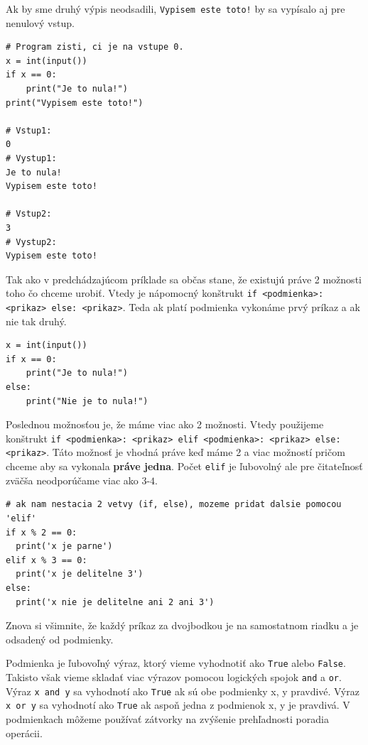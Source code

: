 \documentclass{article}
\begin{document}
Ak by sme druhý výpis neodsadili, \texttt{Vypisem este toto!} by sa vypísalo aj pre nenulový vstup.
\begin{lstlisting}
# Program zisti, ci je na vstupe 0.
x = int(input())
if x == 0:
    print("Je to nula!")
print("Vypisem este toto!")
    
# Vstup1:
0
# Vystup1:
Je to nula!
Vypisem este toto!

# Vstup2:
3
# Vystup2:
Vypisem este toto!
\end{lstlisting}

Tak ako v predchádzajúcom príklade sa občas stane, že existujú práve 2 možnosti toho čo chceme urobiť. Vtedy je nápomocný konštrukt \texttt{if <podmienka>: <prikaz> else: <prikaz>}. Teda ak platí podmienka vykonáme prvý príkaz a ak nie tak druhý.

\begin{lstlisting}
x = int(input())
if x == 0:
    print("Je to nula!")
else:
    print("Nie je to nula!")
\end{lstlisting}

Poslednou možnosťou je, že máme viac ako 2 možnosti. Vtedy použijeme konštrukt \texttt{if <podmienka>: <prikaz> elif <podmienka>: <prikaz> else: <prikaz>}.
Táto možnosť je vhodná práve keď máme 2 a viac možností pričom chceme aby sa vykonala \textbf{práve jedna}. Počet \texttt{elif} je ľubovolný ale pre čitateľnosť zväčša neodporúčame viac ako $3$-$4$.

\begin{lstlisting}
# ak nam nestacia 2 vetvy (if, else), mozeme pridat dalsie pomocou 'elif'
if x % 2 == 0:
  print('x je parne')
elif x % 3 == 0:
  print('x je delitelne 3')
else:
  print('x nie je delitelne ani 2 ani 3')
\end{lstlisting}
Znova si všimnite, že každý príkaz za dvojbodkou je na samostatnom riadku a je odsadený od podmienky.


Podmienka je ľubovoľný výraz, ktorý vieme vyhodnotiť ako \texttt{True} alebo \texttt{False}.
Takisto však vieme skladať viac výrazov pomocou logických spojok \texttt{and} a \texttt{or}.
Výraz \texttt{x and y} sa vyhodnotí ako \texttt{True} ak sú obe podmienky x, y pravdivé. 
Výraz \texttt{x or y} sa vyhodnotí ako \texttt{True} ak aspoň jedna z podmienok x, y je pravdivá.
V podmienkach môžeme používať zátvorky na zvýšenie prehľadnosti poradia operácii.
\end{document}

